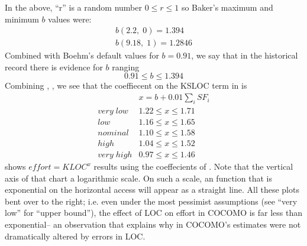 In the  above,  ``r'' is a random number $0 \le r \le 1$ so Baker's maximum and minimum $b$ values
were:
\[
\begin{array}{c}
b(2.2,\; 0) = 1.394\\
b(9.18,\; 1) =1.2846
\end{array}
\]
Combined with Boehm's default values for $b=0.91$, we say that in the historical record
there is evidence for $b$ ranging
\begin{equation}\label{eq:sf2}
0.91 \le b \le 1.394
\end{equation}
Combining , ,  we see that the coeffiecent on the 
KSLOC term in  is 
\begin{equation}\label{eq:sf3} 
\begin{array}{r|l}
                  &  x= b + 0.01 \sum_i SF_i \\\hline
\mathit{very\; low} &  1.22 \le x \le 1.71\\
\mathit{  low} &  1.16 \le x \le 1.65 \\
\mathit{nominal}& 1.10 \le x \le 1.58    \\
\mathit{high} &  1.04 \le x \le 1.52  \\
\mathit{very\; high} & 0.97 \le x \le 1.46   
\end{array}
\end{equation} 
 shows   $\mathit{effort} = \mathit{KLOC}^x$ results using the coeffecients
of . Note that the vertical axis of that chart a logarithmic scale.
On such a scale, an function that is exponential on the horizontal access will
appear as a straight line. All these plots bent over to the right; i.e. even
under the most pessimist  assumptions (see ``very low'' for ``upper bound''), the
effect of LOC on effort in COCOMO is far less than exponential-- an observation
that explains why in  COCOMO's estimates were not dramatically altered
by errors in LOC.

